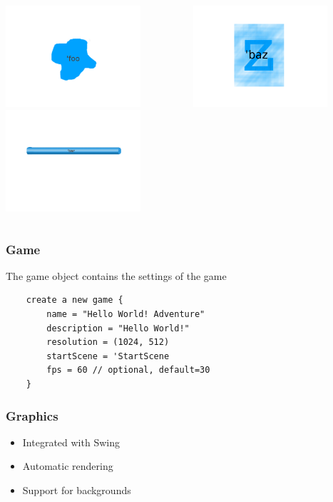 \documentclass{beamer}
\begin{document}
{\begin{frame}
    \begin{columns}[T]
    \begin{column}[T]{5cm}
    \includegraphics[width=5cm, trim= 4cm 4cm 4cm 4cm]{foo-instance}\\
    \includegraphics[width=5cm, trim= 4cm 4cm 4cm 4cm]{bar-instance}
    \end{column}
    \begin{column}[T]{4cm}
    \includegraphics[width=5cm]{baz-instance}
    \end{column}
    \end{columns}
\end{frame}
}

\begin{frame}[fragile]
    \frametitle{Game}
    The game object contains the settings of the game
    \begin{lstlisting}
    create a new game {
        name = "Hello World! Adventure"
        description = "Hello World!"
        resolution = (1024, 512)
        startScene = 'StartScene
        fps = 60 // optional, default=30
    }
    \end{lstlisting}
\end{frame}

\begin{frame}
    \frametitle{Graphics}
    \begin{itemize}[<+->]
        \item{Integrated with Swing}
        \item{Automatic rendering}
        \item{Support for backgrounds}
    \end{itemize}
\end{frame}
\end{document}
